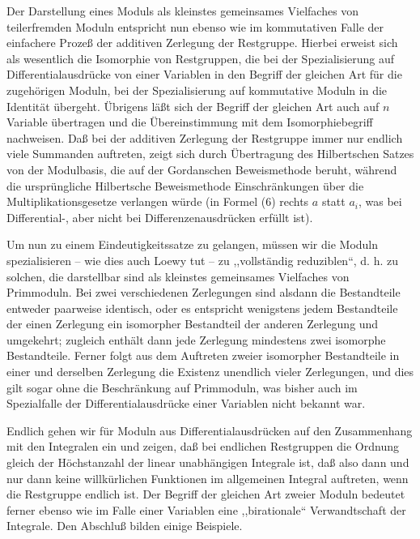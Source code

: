 \documentclass[11pt]{article}
\begin{document}
Der Darstellung eines Moduls als kleinstes gemeinsames Vielfaches von teilerfremden Moduln entspricht nun ebenso wie im kommutativen Falle der einfachere Prozeß der additiven Zerlegung der Restgruppe. Hierbei erweist sich als wesentlich die Isomorphie von Restgruppen, die bei der Spezialisierung auf Differentialausdrücke von einer Variablen in den Begriff der gleichen Art für die zugehörigen Moduln, bei der Spezialisierung auf kommutative Moduln in die Identität übergeht. Übrigens läßt sich der Begriff der gleichen Art auch auf $n$ Variable übertragen und die Übereinstimmung mit dem Isomorphiebegriff nachweisen. Daß bei der additiven Zerlegung der Restgruppe immer nur endlich viele Summanden auftreten, zeigt sich durch Übertragung des Hilbertschen Satzes von der Modulbasis, die auf der Gordanschen Beweismethode beruht, während die ursprüngliche Hilbertsche Beweismethode Einschränkungen über die Multiplikationsgesetze verlangen würde (in Formel (6) rechts $a$ statt $a_i$, was bei Differential-, aber nicht bei Differenzenausdrücken erfüllt ist).

Um nun zu einem Eindeutigkeitssatze zu gelangen, müssen wir die Moduln spezialisieren -- wie dies auch Loewy tut -- zu ,,vollständig reduziblen``, d. h. zu solchen, die darstellbar sind als kleinstes gemeinsames Vielfaches von Primmoduln. Bei zwei verschiedenen Zerlegungen sind alsdann die Bestandteile entweder paarweise identisch, oder es entspricht wenigstens jedem Bestandteile der einen Zerlegung ein isomorpher Bestandteil der anderen Zerlegung und umgekehrt; zugleich enthält dann jede Zerlegung mindestens zwei isomorphe Bestandteile. Ferner folgt aus dem Auftreten zweier isomorpher Bestandteile in einer und derselben Zerlegung die Existenz unendlich vieler Zerlegungen, und dies gilt sogar ohne die Beschränkung auf Primmoduln, was bisher auch im Spezialfalle der Differentialausdrücke einer Variablen nicht bekannt war.

Endlich gehen wir für Moduln aus Differentialausdrücken auf den Zusammenhang mit den Integralen ein und zeigen, daß bei endlichen Restgruppen die Ordnung gleich der Höchstanzahl der linear unabhängigen Integrale ist, daß also dann und nur dann keine willkürlichen Funktionen im allgemeinen Integral auftreten, wenn die Restgruppe endlich ist. Der Begriff der gleichen Art zweier Moduln bedeutet ferner ebenso wie im Falle einer Variablen eine ,,birationale`` Verwandtschaft der Integrale. Den Abschluß bilden einige Beispiele.
\end{document}
